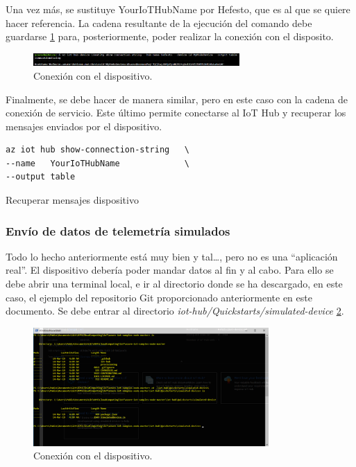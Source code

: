 \documentclass[english,runningheads,a4paper]{llncs}[2018/03/10]
\begin{document}
Una vez más, se sustituye YourIoTHubName por Hefesto, que es al que se quiere
hacer referencia. La cadena resultante de la ejecución del comando debe 
guardarse \hyperref[constring]{\ref{constring}} para, posteriormente, poder 
realizar la conexión con el disposito.

\begin{figure}[h!]
 \centering
 \includegraphics[width=0.7\textwidth]{./IoT/MicrosoftAzure/3-2_register_device.png}
 \caption{Conexión con el dispositivo.}
 \label{constring}
\end{figure}

Finalmente, se debe hacer de manera similar, pero en este caso con la cadena de
conexión de servicio. Este último permite conectarse al IoT Hub y recuperar los
mensajes enviados por el dispositivo.

\begin{listing}[htp]
\centering
    \begin{verbatim}
az iot hub show-connection-string   \
--name   YourIoTHubName             \
--output table
    \end{verbatim}
\caption{Recuperar mensajes dispositivo}
\label{consercommand}
\end{listing}

\subsubsection{Envío de datos de telemetría simulados}

Todo lo hecho anteriormente está muy bien y tal\ldots, pero no es una
``aplicación real''. El dispositivo debería poder mandar datos al fin y al cabo.
Para ello se debe abrir una terminal local, e ir al directorio donde se ha
descargado, en este caso, el ejemplo del repositorio Git proporcionado
anteriormente en este documento. Se debe entrar al directorio
\textit{iot-hub/Quickstarts/simulated-device}
\hyperref[directory]{\ref{directory}}.

\begin{figure}[h!]
 \centering
 \includegraphics[width=0.8\textwidth]{./IoT/MicrosoftAzure/4-1_send_simulated_telemetry.png}
 \caption{Conexión con el dispositivo.}
 \label{directory}
\end{figure}
\end{document}
